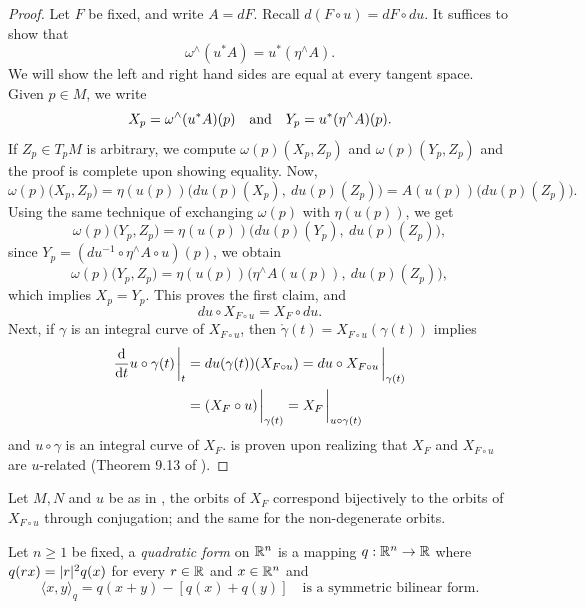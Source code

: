 \documentclass[../main-v2-manifolds.tex]{subfiles}
\begin{document}
\begin{proof}
    Let $F$ be fixed, and write $A = dF$. Recall $d(F\circ u) = dF\circ du$. It suffices to show that
    \begin{equation}
        \omega^{\wedge}(u^* A) = u^*(\eta^{\wedge} A).
        \label{eq:reduction 2 eq3}
    \end{equation}
    We will show the left and right hand sides are equal at every tangent space. Given $p\in M$, we write
    \[X_p = \omega^{\wedge}(u^* A)(p) \qqtext{and} Y_p = u^*(\eta^{\wedge} A)(p).\]
    If $Z_p\in T_pM$ is arbitrary, we compute $\omega(p)(X_p, Z_p)$ and $\omega(p)(Y_p, Z_p)$ and the proof is complete upon showing equality. Now,
    \[\omega(p)\biggl(X_p, Z_p\biggr) = \eta(u(p))\biggl(du(p)(X_p),\: du(p)(Z_p)\biggr)= A(u(p))\biggl(du(p)(Z_p)\biggr).\]
    Using the same technique of exchanging $\omega(p)$ with $\eta(u(p))$, we get
    \[
        \omega(p)\biggl(Y_p, Z_p\biggr) = \eta(u(p))\biggl(du(p)(Y_p),\: du(p)(Z_p)\biggr),
    \]
    since $Y_p = (du^{-1}\circ \eta^{\wedge}A \circ u)(p)$, we obtain
    \[
        \omega(p)\biggl(Y_p, Z_p\biggr) = \eta(u(p))\biggl(\eta^{\wedge}A(u(p)),\: du(p)(Z_p)\biggr),
    \]
    which implies $X_p = Y_p$. This proves the first claim, and 
    \[
        du\circ X_{F\circ u} = X_F\circ du.
    \]
    Next, if $\gamma$ is an integral curve of $X_{F\circ u}$, then $\mathring{\gamma}(t) = X_{F\circ u}(\gamma(t))$ implies
    \begin{align*}
        \dv{t}u\circ \gamma(t)\eval_t &= du(\gamma(t))(X_{F\circ u}) = du\circ X_{F\circ u}\eval_{\gamma(t)} \\
        &= (X_F\circ u)\eval_{\gamma(t)} = X_F\eval_{u\circ \gamma(t)}
    \end{align*}
    and $u\circ \gamma$ is an integral curve of $X_F$.  is proven upon realizing that $X_F$ and $X_{F\circ u}$ are $u$-related (Theorem 9.13 of \cite{Lee2013Introduction}).
\end{proof}
\begin{corollary}
    Let $M,N$ and $u$ be as in , the orbits of $X_F$ correspond bijectively to the orbits of $X_{F\circ u}$ through conjugation; and the same for the non-degenerate orbits.
\end{corollary}
Let $n\geq 1$ be fixed, a \emph{quadratic form} on ${\mathbb{R}^n}$ is a mapping $q:{\mathbb{R}^n}\to\mathbb{R}$ where $q(rx) = \vert {r} \vert^2q(x)$ for every $r\in\mathbb{R}$ and $x\in {\mathbb{R}^n}$ and
\[
   \langle x,y\rangle_{q} = q(x+y) - [q(x)+q(y)]\quad\text{is a symmetric bilinear form.}
\]
\end{document}
